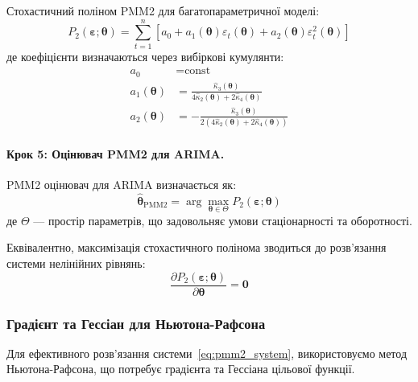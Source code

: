 \documentclass[12pt,a4paper]{article}
\begin{document}
Стохастичний поліном PMM2 для багатопараметричної моделі:
\begin{equation}
\label{eq:pmm2_multivariate}
P_2(\boldsymbol{\varepsilon}; \boldsymbol{\theta}) = \sum_{t=1}^{n} \left[ a_0 + a_1(\boldsymbol{\theta}) \varepsilon_t(\boldsymbol{\theta}) + a_2(\boldsymbol{\theta}) \varepsilon_t^2(\boldsymbol{\theta}) \right]
\end{equation}
де коефіцієнти визначаються через вибіркові кумулянти:
\begin{align}
a_0 &= \text{const} \label{eq:a0_arima} \\
a_1(\boldsymbol{\theta}) &= \frac{\hat{\kappa}_3(\boldsymbol{\theta})}{4\hat{\kappa}_2(\boldsymbol{\theta}) + 2\hat{\kappa}_4(\boldsymbol{\theta})} \label{eq:a1_arima} \\
a_2(\boldsymbol{\theta}) &= -\frac{\hat{\kappa}_3(\boldsymbol{\theta})}{2(4\hat{\kappa}_2(\boldsymbol{\theta}) + 2\hat{\kappa}_4(\boldsymbol{\theta}))} \label{eq:a2_arima}
\end{align}

\paragraph{Крок 5: Оцінювач PMM2 для ARIMA.}

PMM2 оцінювач для ARIMA визначається як:
\begin{equation}
\label{eq:pmm2_arima_estimator}
\hat{\boldsymbol{\theta}}_{\text{PMM2}} = \arg\max_{\boldsymbol{\theta} \in \Theta} P_2(\boldsymbol{\varepsilon}; \boldsymbol{\theta})
\end{equation}
де $\Theta$ --- простір параметрів, що задовольняє умови стаціонарності та оборотності.

Еквівалентно, максимізація стохастичного полінома зводиться до розв'язання системи нелінійних рівнянь:
\begin{equation}
\label{eq:pmm2_system}
\frac{\partial P_2(\boldsymbol{\varepsilon}; \boldsymbol{\theta})}{\partial \boldsymbol{\theta}} = \mathbf{0}
\end{equation}

\subsubsection{Градієнт та Гессіан для Ньютона-Рафсона}

Для ефективного розв'язання системи~\eqref{eq:pmm2_system}, використовуємо метод Ньютона-Рафсона, що потребує градієнта та Гессіана цільової функції.
\end{document}
